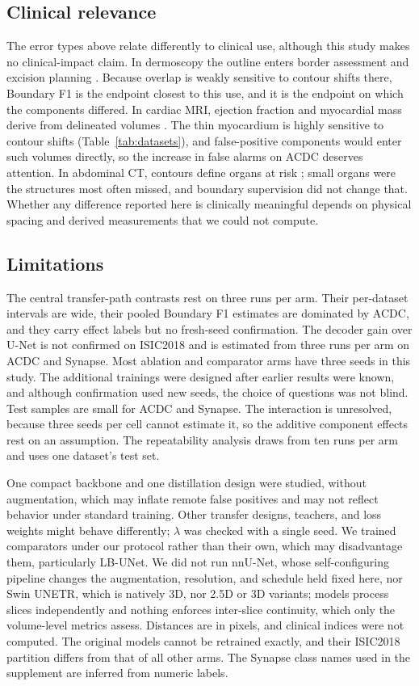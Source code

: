 \documentclass[fleqn,10pt,lineno]{wlpeerj}
\begin{document}
\subsection*{Clinical relevance}
The error types above relate differently to clinical use, although this study makes no clinical-impact claim. In dermoscopy the outline enters border assessment and excision planning \citep{Nachbar1994ABCD}. Because overlap is weakly sensitive to contour shifts there, Boundary F1 is the endpoint closest to this use, and it is the endpoint on which the components differed. In cardiac MRI, ejection fraction and myocardial mass derive from delineated volumes \citep{Bernard2018Deep}. The thin myocardium is highly sensitive to contour shifts (Table~\ref{tab:datasets}), and false-positive components would enter such volumes directly, so the increase in false alarms on ACDC deserves attention. In abdominal CT, contours define organs at risk \citep{Jabbour2014Upper}; small organs were the structures most often missed, and boundary supervision did not change that. Whether any difference reported here is clinically meaningful depends on physical spacing and derived measurements that we could not compute.

\subsection*{Limitations}
The central transfer-path contrasts rest on three runs per arm. Their per-dataset intervals are wide, their pooled Boundary F1 estimates are dominated by ACDC, and they carry effect labels but no fresh-seed confirmation. The decoder gain over U-Net is not confirmed on ISIC2018 and is estimated from three runs per arm on ACDC and Synapse. Most ablation and comparator arms have three seeds in this study. The additional trainings were designed after earlier results were known, and although confirmation used new seeds, the choice of questions was not blind. Test samples are small for ACDC and Synapse. The interaction is unresolved, because three seeds per cell cannot estimate it, so the additive component effects rest on an assumption. The repeatability analysis draws from ten runs per arm and uses one dataset's test set.

One compact backbone and one distillation design were studied, without augmentation, which may inflate remote false positives and may not reflect behavior under standard training. Other transfer designs, teachers, and loss weights might behave differently; $\lambda$ was checked with a single seed. We trained comparators under our protocol rather than their own, which may disadvantage them, particularly LB-UNet. We did not run nnU-Net, whose self-configuring pipeline changes the augmentation, resolution, and schedule held fixed here, nor Swin UNETR, which is natively 3D, nor 2.5D or 3D variants; models process slices independently and nothing enforces inter-slice continuity, which only the volume-level metrics assess. Distances are in pixels, and clinical indices were not computed. The original models cannot be retrained exactly, and their ISIC2018 partition differs from that of all other arms. The Synapse class names used in the supplement are inferred from numeric labels.
\end{document}
